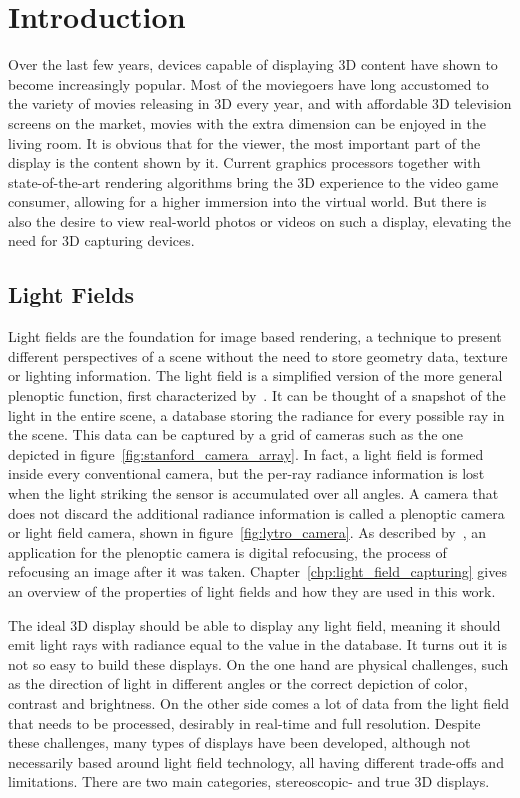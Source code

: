 \chapter{Introduction}
\label{chp:introduction}

Over the last few years, devices capable of displaying 3D content have shown to become increasingly popular.
Most of the moviegoers have long accustomed to the variety of movies releasing in 3D every year, and with affordable 3D television screens on the market, movies with the extra dimension can be enjoyed in the living room.
It is obvious that for the viewer, the most important part of the display is the content shown by it.
Current graphics processors together with state-of-the-art rendering algorithms bring the 3D experience to the video game consumer, allowing for a higher immersion into the virtual world.
But there is also the desire to view real-world photos or videos on such a display, elevating the need for 3D capturing devices.

\section{Light Fields}

Light fields are the foundation for image based rendering, a technique to present different perspectives of a scene without the need to store geometry data, texture or lighting information.
The light field is a simplified version of the more general plenoptic function, first characterized by~\cite{AdelsonBergen}.
It can be thought of a snapshot of the light in the entire scene, a database storing the radiance for every possible ray in the scene.
This data can be captured by a grid of cameras such as the one depicted in figure~\ref{fig:stanford_camera_array}.
In fact, a light field is formed inside every conventional camera, but the per-ray radiance information is lost when the light striking the sensor is accumulated over all angles. 
A camera that does not discard the additional radiance information is called a plenoptic camera or light field camera, shown in figure~\ref{fig:lytro_camera}.
As described by~\cite{LightFieldPhotographyHandHeldPlenopticCamera}, an application for the plenoptic camera is digital refocusing, the process of refocusing an image after it was taken.
Chapter~\ref{chp:light_field_capturing} gives an overview of the properties of light fields and how they are used in this work.

The ideal 3D display should be able to display any light field, meaning it should emit light rays with radiance equal to the value in the database.
It turns out it is not so easy to build these displays. 
On the one hand are physical challenges, such as the direction of light in different angles or the correct depiction of color, contrast and brightness.
On the other side comes a lot of data from the light field that needs to be processed, desirably in real-time and full resolution.
Despite these challenges, many types of displays have been developed, although not necessarily based around light field technology, all having different trade-offs and limitations.
There are two main categories, stereoscopic- and true 3D displays.

